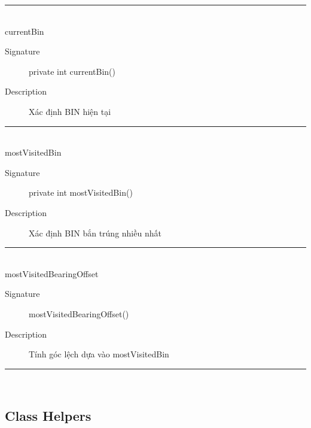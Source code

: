 \documentclass[14pt]{article}
\newcommand{\sep}{\rule{\textwidth}{0.007pt}\\}
\begin{document}
\sep
currentBin
	\begin{description}
		\item[Signature]private int currentBin()
		\item[Description] Xác định BIN hiện tại
	\end{description}		
\sep
mostVisitedBin
	\begin{description}
		\item[Signature]private int mostVisitedBin()
		\item[Description] Xác định BIN bắn trúng nhiều nhất
	\end{description}		
\sep
mostVisitedBearingOffset
	\begin{description}
		\item[Signature]mostVisitedBearingOffset()
		\item[Description] Tính góc lệch dựa vào mostVisitedBin
	\end{description}		
\sep

\subsection{Class Helpers}
\end{document}
